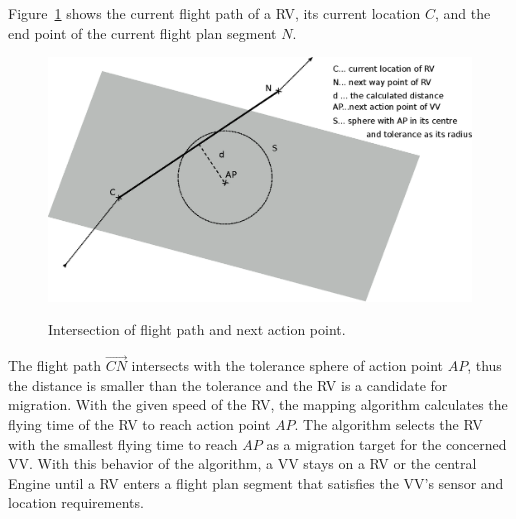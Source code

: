 Figure~\ref{fig:intersectionExample} shows the current flight path of a \ac{RV}, its current location $C$,
and the end point of the current flight plan segment $N$.
\begin{figure}[h]
	\begin{center}
		{
            \includegraphics[width=12cm]{dist.eps}
        }
	\end{center}
	\caption{Intersection of flight path and next action point.\label{fig:intersectionExample}}
\end{figure}
The flight path $\displaystyle{\overrightarrow{CN}}$ intersects with the tolerance sphere of action point $AP$, thus
the distance is smaller than the tolerance and the \ac{RV} is a candidate for migration. With the given speed
of the \ac{RV}, the mapping algorithm calculates the flying time of the \ac{RV} to reach action point $AP$. The
algorithm selects the \ac{RV} with the smallest flying time to reach $AP$ as a migration target for the concerned
\ac{VV}.
%
With this behavior of the algorithm, a \ac{VV} stays on a \ac{RV} or the central Engine until a \ac{RV}
enters a flight plan segment that satisfies the \ac{VV}'s sensor and location requirements.



